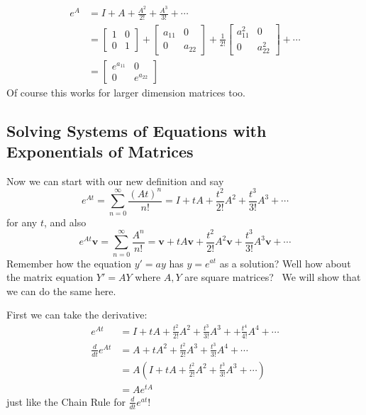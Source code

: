 \documentclass[letterpaper, 11pt, openany]{book}
\theoremstyle{mytheoremstyle}
\theoremstyle{myexamplestyle}
\begin{document}
\begin{align*}
    e^{A}   &= I + A + \frac{A^{2}}{2!} + \frac{A^{3}}{3!} + \cdots \\
            &= \begin{bmatrix}
                1 & 0\\
                0 & 1
            \end{bmatrix} + 
            \begin{bmatrix}
                a_{11} & 0\\
                0 & a_{22}
            \end{bmatrix} + 
            \frac{1}{2!}\begin{bmatrix}
                a_{11}^{2} & 0\\
                0 & a_{22}^{2}
            \end{bmatrix} + \cdots \\
            &= \begin{bmatrix}
                e^{a_{11}} & 0 \\
                0 & e^{a_{22}}
            \end{bmatrix}
\end{align*}
Of course this works for larger dimension matrices too.

\subsection{Solving Systems of Equations with Exponentials of Matrices}

Now we can start with our new definition and say
\[e^{At} = \sum_{n=0}^{\infty} \frac{(At)^{n}}{n!} = I + tA + \frac{t^{2}}{2!}A^{2} + \frac{t^{3}}{3!}A^{3} + \cdots\]
for any \(t\), and also
\[e^{At}\mathbf{v} = \sum_{n=0}^{\infty} \frac{A^{n}}{n!} = \mathbf{v} + tA\mathbf{v} + \frac{t^{2}}{2!}A^{2}\mathbf{v} + \frac{t^{3}}{3!}A^{3}\mathbf{v} + \cdots\]
Remember how the equation \(y' = ay\) has \(y = e^{at}\) as a solution? Well how about the matrix equation \(Y' = AY\) where \(A,Y\) are square matrices? \faSmile \ We will show that we can do the same here.

First we can take the derivative:
\begin{align*}
    e^{At} &= I + tA + \frac{t^{2}}{2!}A^{2} + \frac{t^{3}}{3!}A^{3} + + \frac{t^{4}}{4!}A^{4} + \cdots\\
    \frac{d}{dt} e^{At}     &= A + tA^{2} + \frac{t^{2}}{2!}A^{3} + \frac{t^{3}}{3!}A^{4} + \cdots \\
                            &= A\left(I + tA + \frac{t^{2}}{2!}A^{2} + \frac{t^{3}}{3!}A^{3} + \cdots\right)\\
                            &= Ae^{tA}
\end{align*}
just like the Chain Rule for \(\frac{d}{dt} e^{at}\)! \faSmile
\end{document}

